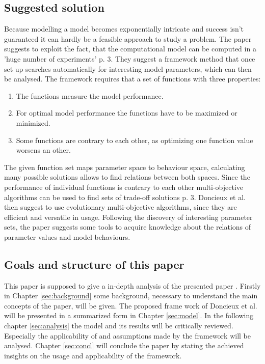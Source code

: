 \documentclass[12pt,twoside]{article}
\theoremstyle{plain}
\theoremstyle{definition}
\theoremstyle{remark}
\begin{document}
\subsection{Suggested solution}
Because modelling a model becomes exponentially intricate and success isn't guaranteed it can hardly be a feasible approach to study a problem. The paper suggests to exploit the fact, that the computational model can be computed in a 'huge number of experiments' \cite{doncieux2015multi} p. 3.
They suggest a framework method that once set up searches automatically for interesting model parameters, which can then be analysed.
The framework requires that a set of functions with three properties:
\begin{enumerate}
	\item The functions measure the model performance.
	\item For optimal model performance the functions have to be maximized or minimized.
	\item Some functions are contrary to each other, as optimizing one function value worsens an other.
\end{enumerate}
The given function set maps parameter space to behaviour space, calculating many possible solutions allows to find relations between both spaces.
Since the performance of individual functions is contrary to each other multi-objective algorithms can be used to find sets of trade-off solutions \cite{doncieux2015multi} p. 3.
Doncieux et al. then suggest to use evolutionary multi-objective algorithms, since they are efficient and versatile in usage.
Following the discovery of interesting parameter sets, the paper suggests some tools to acquire knowledge about the relations of parameter values and model behaviours.

\subsection{Goals and structure of this paper}
This paper is supposed to give a in-depth analysis of the presented paper \cite{doncieux2015multi}.
Firstly in Chapter \ref{sec:background} some background, necessary to understand the main concepts of the paper, will be given.
The proposed frame work of Doncieux et al. will be presented in a summarized form in Chapter \ref{sec:model}.
In the following chapter \ref{sec:analysis} the model and its results will be critically reviewed.
Especially the applicability of and assumptions made by the framework will be analysed.
Chapter \ref{sec:concl} will conclude the paper by stating the achieved insights on the usage and applicability of the framework. 
\end{document}
